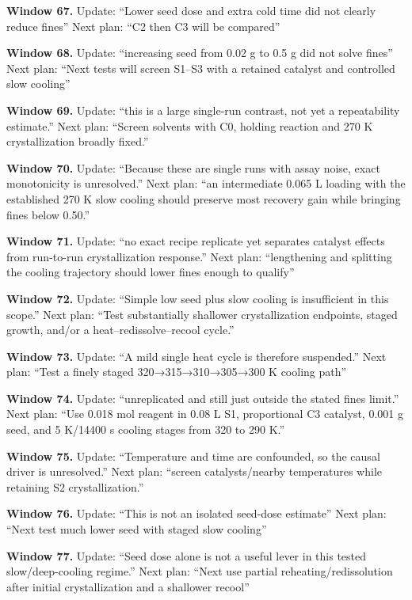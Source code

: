 \documentclass[10pt,a4paper]{article}
\begin{document}
\textbf{Window 67.} Update: ``Lower seed dose and extra cold time did not clearly reduce fines'' Next plan: ``C2 then C3 will be compared''

\textbf{Window 68.} Update: ``increasing seed from 0.02 g to 0.5 g did not solve fines'' Next plan: ``Next tests will screen S1--S3 with a retained catalyst and controlled slow cooling''

\textbf{Window 69.} Update: ``this is a large single-run contrast, not yet a repeatability estimate.'' Next plan: ``Screen solvents with C0, holding reaction and 270 K crystallization broadly fixed.''

\textbf{Window 70.} Update: ``Because these are single runs with assay noise, exact monotonicity is unresolved.'' Next plan: ``an intermediate 0.065 L loading with the established 270 K slow cooling should preserve most recovery gain while bringing fines below 0.50.''

\textbf{Window 71.} Update: ``no exact recipe replicate yet separates catalyst effects from run-to-run crystallization response.'' Next plan: ``lengthening and splitting the cooling trajectory should lower fines enough to qualify''

\textbf{Window 72.} Update: ``Simple low seed plus slow cooling is insufficient in this scope.'' Next plan: ``Test substantially shallower crystallization endpoints, staged growth, and/or a heat--redissolve--recool cycle.''

\textbf{Window 73.} Update: ``A mild single heat cycle is therefore suspended.'' Next plan: ``Test a finely staged 320→315→310→305→300 K cooling path''

\textbf{Window 74.} Update: ``unreplicated and still just outside the stated fines limit.'' Next plan: ``Use 0.018 mol reagent in 0.08 L S1, proportional C3 catalyst, 0.001 g seed, and 5 K/14400 s cooling stages from 320 to 290 K.''

\textbf{Window 75.} Update: ``Temperature and time are confounded, so the causal driver is unresolved.'' Next plan: ``screen catalysts/nearby temperatures while retaining S2 crystallization.''

\textbf{Window 76.} Update: ``This is not an isolated seed-dose estimate'' Next plan: ``Next test much lower seed with staged slow cooling''

\textbf{Window 77.} Update: ``Seed dose alone is not a useful lever in this tested slow/deep-cooling regime.'' Next plan: ``Next use partial reheating/redissolution after initial crystallization and a shallower recool''
\end{document}

